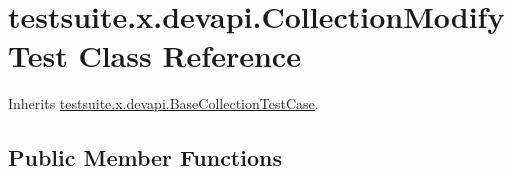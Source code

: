 \hypertarget{classtestsuite_1_1x_1_1devapi_1_1_collection_modify_test}{}\section{testsuite.\+x.\+devapi.\+Collection\+Modify\+Test Class Reference}
\label{classtestsuite_1_1x_1_1devapi_1_1_collection_modify_test}


Inherits \mbox{\hyperlink{classtestsuite_1_1x_1_1devapi_1_1_base_collection_test_case}{testsuite.\+x.\+devapi.\+Base\+Collection\+Test\+Case}}.

\subsection*{Public Member Functions}
